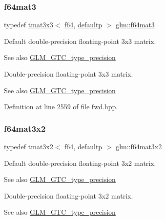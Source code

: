 \subsubsection{\texorpdfstring{f64mat3}{f64mat3}}
{\footnotesize\ttfamily typedef \mbox{\hyperlink{structglm_1_1tmat3x3}{tmat3x3}}$<$ \mbox{\hyperlink{group__gtc__type__precision_ga2bba392e555124b36cde6abba349bab3}{f64}}, \mbox{\hyperlink{namespaceglm_a0f04f086094c747d227af4425893f545a9d21ccd8b5a009ec7eb7677befc3bf51}{defaultp}} $>$ \mbox{\hyperlink{group__gtc__type__precision_ga44f23eb3c2e893d0afb1aa2b9e89be76}{glm\+::f64mat3}}}

Default double-\/precision floating-\/point 3x3 matrix. \begin{DoxySeeAlso}{See also}
\mbox{\hyperlink{group__gtc__type__precision}{G\+L\+M\+\_\+\+G\+T\+C\+\_\+type\+\_\+precision}}
\end{DoxySeeAlso}
Double-\/precision floating-\/point 3x3 matrix. \begin{DoxySeeAlso}{See also}
\mbox{\hyperlink{group__gtc__type__precision}{G\+L\+M\+\_\+\+G\+T\+C\+\_\+type\+\_\+precision}} 
\end{DoxySeeAlso}


Definition at line 2559 of file fwd.\+hpp.

\mbox{\label{group__gtc__type__precision_ga0039ae03558b5242466f4c344c3c7d65}} 
\subsubsection{\texorpdfstring{f64mat3x2}{f64mat3x2}}
{\footnotesize\ttfamily typedef \mbox{\hyperlink{structglm_1_1tmat3x2}{tmat3x2}}$<$ \mbox{\hyperlink{group__gtc__type__precision_ga2bba392e555124b36cde6abba349bab3}{f64}}, \mbox{\hyperlink{namespaceglm_a0f04f086094c747d227af4425893f545a9d21ccd8b5a009ec7eb7677befc3bf51}{defaultp}} $>$ \mbox{\hyperlink{group__gtc__type__precision_ga0039ae03558b5242466f4c344c3c7d65}{glm\+::f64mat3x2}}}

Default double-\/precision floating-\/point 3x2 matrix. \begin{DoxySeeAlso}{See also}
\mbox{\hyperlink{group__gtc__type__precision}{G\+L\+M\+\_\+\+G\+T\+C\+\_\+type\+\_\+precision}}
\end{DoxySeeAlso}
Double-\/precision floating-\/point 3x2 matrix. \begin{DoxySeeAlso}{See also}
\mbox{\hyperlink{group__gtc__type__precision}{G\+L\+M\+\_\+\+G\+T\+C\+\_\+type\+\_\+precision}} 
\end{DoxySeeAlso}


